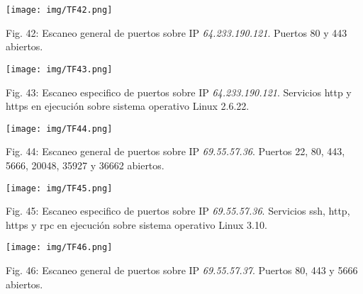 \documentclass[12pt,oneside,a4paper]{book}
\begin{document}
\vspace{2em}

\begin{center}
	\texttt{[image: img/TF42.png]}
    
\vspace{0.1em}
    
    Fig. 42: Escaneo general de puertos sobre IP \textit{64.233.190.121}. Puertos 80 y 443 abiertos.
\end{center}

\vspace{2em}

\begin{center}
	\texttt{[image: img/TF43.png]}
    
\vspace{0.1em}
    
    Fig. 43: Escaneo especifico de puertos sobre IP \textit{64.233.190.121}. Servicios http y https en ejecución sobre sistema operativo Linux 2.6.22.
\end{center}

\vspace{2em}

\begin{center}
	\texttt{[image: img/TF44.png]}
    
\vspace{0.1em}
    
    Fig. 44: Escaneo general de puertos sobre IP \textit{69.55.57.36}. Puertos 22, 80, 443, 5666, 20048, 35927 y 36662 abiertos.
\end{center}

\vspace{2em}

\begin{center}
	\texttt{[image: img/TF45.png]}
    
\vspace{0.1em}
    
    Fig. 45: Escaneo especifico de puertos sobre IP \textit{69.55.57.36}. Servicios ssh, http, https y rpc en ejecución sobre sistema operativo Linux 3.10.
\end{center}

\vspace{2em}

\begin{center}
	\texttt{[image: img/TF46.png]}
    
\vspace{0.1em}
    
    Fig. 46: Escaneo general de puertos sobre IP \textit{69.55.57.37}. Puertos 80, 443 y 5666 abiertos.
\end{center}
\end{document}
